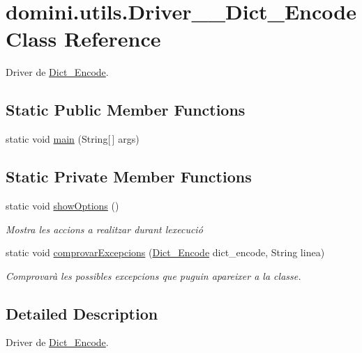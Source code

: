 \hypertarget{classdomini_1_1utils_1_1Driver____Dict__Encode}{}\section{domini.\+utils.\+Driver\+\_\+\+\_\+\+Dict\+\_\+\+Encode Class Reference}
\label{classdomini_1_1utils_1_1Driver____Dict__Encode}


Driver de \hyperlink{classdomini_1_1utils_1_1Dict__Encode}{Dict\+\_\+\+Encode}.  


\subsection*{Static Public Member Functions}
\begin{DoxyCompactItemize}
\item 
static void \hyperlink{classdomini_1_1utils_1_1Driver____Dict__Encode_a67a9ab54d3335c433791b823d192ac8f}{main} (String\mbox{[}$\,$\mbox{]} args)
\end{DoxyCompactItemize}
\subsection*{Static Private Member Functions}
\begin{DoxyCompactItemize}
\item 
static void \hyperlink{classdomini_1_1utils_1_1Driver____Dict__Encode_a8b24c280193457c6620b2b5906018c34}{show\+Options} ()
\begin{DoxyCompactList}\small\item\em Mostra les accions a realitzar durant l\textquotesingle{}execució \end{DoxyCompactList}\item 
static void \hyperlink{classdomini_1_1utils_1_1Driver____Dict__Encode_ab67e87f26a75c12e50130a5e5facb52e}{comprovar\+Excepcions} (\hyperlink{classdomini_1_1utils_1_1Dict__Encode}{Dict\+\_\+\+Encode} dict\+\_\+encode, String linea)
\begin{DoxyCompactList}\small\item\em Comprovarà les possibles excepcions que puguin apareixer a la classe. \end{DoxyCompactList}\end{DoxyCompactItemize}


\subsection{Detailed Description}
Driver de \hyperlink{classdomini_1_1utils_1_1Dict__Encode}{Dict\+\_\+\+Encode}. 

